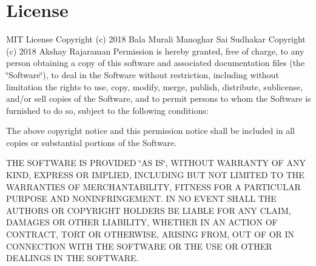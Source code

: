 \hypertarget{index_License}{}\section{License}\label{index_License}
M\+IT License Copyright (c) 2018 Bala Murali Manoghar Sai Sudhakar Copyright (c) 2018 Akshay Rajaraman Permission is hereby granted, free of charge, to any person obtaining a copy of this software and associated documentation files (the \char`\"{}\+Software\char`\"{}), to deal in the Software without restriction, including without limitation the rights to use, copy, modify, merge, publish, distribute, sublicense, and/or sell copies of the Software, and to permit persons to whom the Software is furnished to do so, subject to the following conditions\+:

The above copyright notice and this permission notice shall be included in all copies or substantial portions of the Software.

T\+HE S\+O\+F\+T\+W\+A\+RE IS P\+R\+O\+V\+I\+D\+ED \char`\"{}\+A\+S I\+S\char`\"{}, W\+I\+T\+H\+O\+UT W\+A\+R\+R\+A\+N\+TY OF A\+NY K\+I\+ND, E\+X\+P\+R\+E\+SS OR I\+M\+P\+L\+I\+ED, I\+N\+C\+L\+U\+D\+I\+NG B\+UT N\+OT L\+I\+M\+I\+T\+ED TO T\+HE W\+A\+R\+R\+A\+N\+T\+I\+ES OF M\+E\+R\+C\+H\+A\+N\+T\+A\+B\+I\+L\+I\+TY, F\+I\+T\+N\+E\+SS F\+OR A P\+A\+R\+T\+I\+C\+U\+L\+AR P\+U\+R\+P\+O\+SE A\+ND N\+O\+N\+I\+N\+F\+R\+I\+N\+G\+E\+M\+E\+NT. IN NO E\+V\+E\+NT S\+H\+A\+LL T\+HE A\+U\+T\+H\+O\+RS OR C\+O\+P\+Y\+R\+I\+G\+HT H\+O\+L\+D\+E\+RS BE L\+I\+A\+B\+LE F\+OR A\+NY C\+L\+A\+IM, D\+A\+M\+A\+G\+ES OR O\+T\+H\+ER L\+I\+A\+B\+I\+L\+I\+TY, W\+H\+E\+T\+H\+ER IN AN A\+C\+T\+I\+ON OF C\+O\+N\+T\+R\+A\+CT, T\+O\+RT OR O\+T\+H\+E\+R\+W\+I\+SE, A\+R\+I\+S\+I\+NG F\+R\+OM, O\+UT OF OR IN C\+O\+N\+N\+E\+C\+T\+I\+ON W\+I\+TH T\+HE S\+O\+F\+T\+W\+A\+RE OR T\+HE U\+SE OR O\+T\+H\+ER D\+E\+A\+L\+I\+N\+GS IN T\+HE S\+O\+F\+T\+W\+A\+RE. 